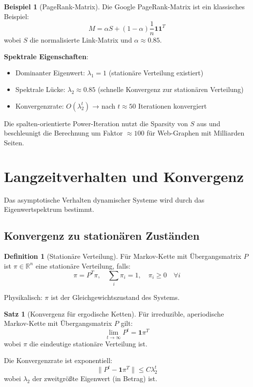 \documentclass[a4paper,12pt]{report}
\theoremstyle{definition}
\newtheorem{definition}{Definition}
\newtheorem{beispiel}{Beispiel}
\newtheorem{satz}{Satz}
\begin{document}
	\begin{beispiel}[PageRank-Matrix]
		Die Google PageRank-Matrix ist ein klassisches Beispiel:
		\[
		M = \alpha S + (1-\alpha) \frac{1}{n} \mathbf{1}\mathbf{1}^T
		\]
		wobei $S$ die normalisierte Link-Matrix und $\alpha \approx 0.85$.
		
		\textbf{Spektrale Eigenschaften}:
		\begin{itemize}
			\item Dominanter Eigenwert: $\lambda_1 = 1$ (stationäre Verteilung existiert)
			\item Spektrale Lücke: $\lambda_2 \approx 0.85$ (schnelle Konvergenz zur stationären Verteilung)
			\item Konvergenzrate: $O(\lambda_2^t)$ → nach $t \approx 50$ Iterationen konvergiert
		\end{itemize}
		
		Die spalten-orientierte Power-Iteration nutzt die Sparsity von $S$ aus und beschleunigt die Berechnung um Faktor $\approx 100$ für Web-Graphen mit Milliarden Seiten.
	\end{beispiel}
	
	\section{Langzeitverhalten und Konvergenz}
	
	Das asymptotische Verhalten dynamischer Systeme wird durch das Eigenwertspektrum bestimmt.
	
	\subsection{Konvergenz zu stationären Zuständen}
	
	\begin{definition}[Stationäre Verteilung]
		Für Markov-Kette mit Übergangsmatrix $P$ ist $\pi \in \mathbb{R}^n$ eine stationäre Verteilung, falls:
		\[
		\pi = P^T \pi, \quad \sum_i \pi_i = 1, \quad \pi_i \geq 0 \quad \forall i
		\]
		
		Physikalisch: $\pi$ ist der Gleichgewichtszustand des Systems.
	\end{definition}
	
	\begin{satz}[Konvergenz für ergodische Ketten]
		Für irreduzible, aperiodische Markov-Kette mit Übergangsmatrix $P$ gilt:
		\[
		\lim_{t \to \infty} P^t = \mathbf{1} \pi^T
		\]
		wobei $\pi$ die eindeutige stationäre Verteilung ist.
		
		Die Konvergenzrate ist exponentiell:
		\[
		\|P^t - \mathbf{1}\pi^T\| \leq C \lambda_2^t
		\]
		wobei $\lambda_2$ der zweitgrößte Eigenwert (in Betrag) ist.
	\end{satz}
	
\end{document}
